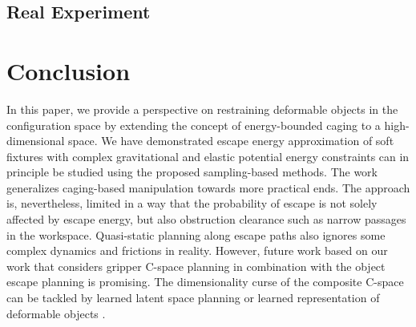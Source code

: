 \documentclass[conference]{IEEEtran}
\begin{document}
\subsection{Real Experiment}

\section{Conclusion}
In this paper, we provide a perspective on restraining deformable objects in the configuration space by extending the concept of energy-bounded caging to a high-dimensional space.
We have demonstrated escape energy approximation of soft fixtures with complex gravitational and elastic potential energy constraints can in principle be studied using the proposed sampling-based methods.
The work generalizes caging-based manipulation towards more practical ends.
The approach is, nevertheless, limited in a way that the probability of escape is not solely affected by escape energy, but also obstruction clearance such as narrow passages in the workspace.
Quasi-static planning along escape paths also ignores some complex dynamics and frictions in reality.
However, future work based on our work that considers gripper C-space planning in combination with the object escape planning is promising.
The dimensionality curse of the composite C-space can be tackled by learned latent space planning \cite{} or learned representation of deformable objects \cite{}.



\end{document}
